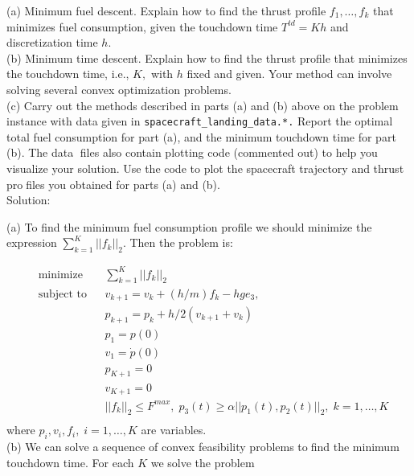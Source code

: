 \documentclass{article}
\begin{document}
(a) Minimum fuel descent. Explain how to find the thrust profile $f_1, \dots, f_k$ that minimizes fuel
consumption, given the touchdown time $T^{td} = Kh$ and discretization time $h.$ \\

(b) Minimum time descent. Explain how to find the thrust profile that minimizes the touchdown time, i.e., $K,$ with $h$ fixed and given. Your method can involve solving several convex optimization problems. \\

(c) Carry out the methods described in parts (a) and (b) above on the problem instance with
data given in \verb!spacecraft_landing_data.*.!
Report the optimal total fuel consumption for
part (a), and the minimum touchdown time for part (b). The data files also contain plotting
code (commented out) to help you visualize your solution. Use the code to plot the spacecraft
trajectory and thrust profiles you obtained for parts (a) and (b).\\

Solution:

(a) To find the minimum fuel consumption profile 
we should minimize the expression 
$\sum_{k = 1}^K ||f_k||_2$. Then the problem is:

\begin{align*}
&\text{minimize} && \sum_{k = 1}^K ||f_k||_2\\ 
&\text{subject to} 
&&v_{k + 1} = v_{k} + (h / m) f_k- hge_3, \\
& &&p_{k + 1} = p_k + h / 2 (v_{k + 1} + v_k)\\
& && p_1 = p(0) \\
& && v_1 = \dot{p}(0)\\
& &&p_{K + 1} = 0 \\
& && v_{K + 1} = 0 \\
& && ||f_k||_2 \leq F^{max}, \; 
p_3(t) \geq \alpha ||p_1(t), p_2(t)||_2, 
\; k = 1, \dots, K\\
\end{align*} 
where $p_i, v_i, f_i, \; i = 1, \dots, K$ are variables.\\

(b) We can solve a sequence of convex feasibility problems tofind the minimum touchdown time. For each $K$ we solve the problem 
\end{document}
